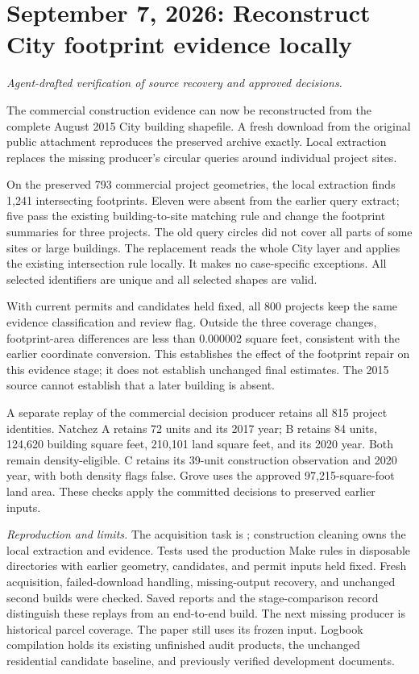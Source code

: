\section*{September 7, 2026: Reconstruct City footprint evidence locally}
\textit{Agent-drafted verification of source recovery and approved decisions.}

The commercial construction evidence can now be reconstructed from the complete
August 2015 City building shapefile. A fresh download from the original public
attachment reproduces the preserved archive exactly. Local extraction replaces
the missing producer's circular queries around individual project sites.

On the preserved 793 commercial project geometries, the local extraction finds
1,241 intersecting footprints. Eleven were absent from the earlier query extract;
five pass the existing building-to-site matching rule and change the footprint
summaries for three projects. The old query circles did not cover all parts of
some sites or large buildings. The replacement reads the whole City layer and
applies the existing intersection rule locally. It makes no case-specific
exceptions. All selected identifiers are unique and all selected shapes are valid.

With current permits and candidates held fixed, all 800 projects keep the same
evidence classification and review flag. Outside the three
coverage changes, footprint-area differences are less than 0.000002 square feet,
consistent with the earlier coordinate conversion. This establishes the effect
of the footprint repair on this evidence stage; it does not establish unchanged
final estimates. The 2015 source cannot establish that a later building is absent.

A separate replay of the commercial decision producer retains all 815 project
identities. Natchez A retains 72 units and its 2017 year; B retains 84 units,
124,620 building square feet, 210,101 land square feet, and its 2020 year.
Both remain density-eligible. C retains its 39-unit construction observation and
2020 year, with both density flags false. Grove uses the approved 97,215-square-foot
land area. These checks apply the committed decisions to preserved earlier inputs.

\textit{Reproduction and limits.} The acquisition task is
; construction cleaning owns the
local extraction and evidence. Tests used the production Make rules in disposable
directories with earlier geometry, candidates, and permit inputs held fixed.
Fresh acquisition, failed-download handling, missing-output recovery, and
unchanged second builds were checked. Saved reports and the stage-comparison
record distinguish these replays from an end-to-end build. The next missing
producer is historical parcel coverage. The paper still uses its frozen input.
Logbook compilation holds its existing unfinished audit products, the unchanged
residential candidate baseline, and previously verified development documents.
